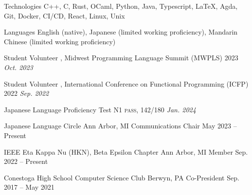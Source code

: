 \documentclass[letterpaper,11pt]{article}
\begin{document}
  \begin{rlinelist}
    \rline
      {Technologies}
      {C++, C, Rust, OCaml, Python, Java, Typescript, \LaTeX, Agda,
        Git, Docker, CI/CD, React, Linux, Unix}
      
    \rline
      {Languages}
      {English (native),
        Japanese (limited working proficiency),
        Mandarin Chinese (limited working proficiency)}
  \end{rlinelist}

  \begin{rsectionlist}
    \rsectionitemthin
      {Student Volunteer}
      {, Midwest Programming Language Summit (MWPLS) 2023}
      {\textit{\small Oct. 2023}}

    \vspace*{-1em}
    \rsectionitemthin
      {Student Volunteer}
      {, International Conference on Functional Programming (ICFP) 2022}
      {\textit{\small Sep. 2022}}
  \end{rsectionlist}

  \begin{rsectionlist}
    \rsectionitemthin
      {Japanese Language Proficiency Test N1}
      { \textsc{pass, 142/180}}
      {\textit{\small Jan. 2024}}
  \end{rsectionlist}

  \begin{rsectionlist}
    \rsectionitem
      {Japanese Language Circle}
      {Ann Arbor, MI}
      {Communications Chair}
      {May 2023 -- Present}


    \rsectionitem
      {IEEE Eta Kappa Nu (HKN), Beta Epsilon Chapter}
      {Ann Arbor, MI}
      {Member}
      {Sep. 2022 -- Present}

    
    \rsectionitem
      {Conestoga High School Computer Science Club}
      {Berwyn, PA}
      {Co-President}
      {Sep. 2017 -- May 2021}

  \end{rsectionlist}
\end{document}
